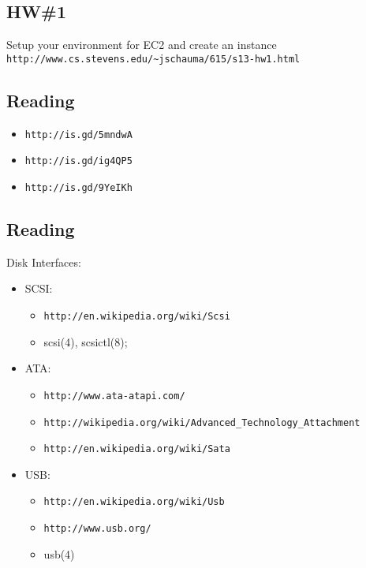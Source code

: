 \documentclass[xga]{xdvislides}
\begin{document}
\subsection{HW\#1}
Setup your environment for EC2 and create an instance
\vfill
\verb+http://www.cs.stevens.edu/~jschauma/615/s13-hw1.html+
\vfill

\subsection{Reading}
\begin{itemize}
	\item \verb+http://is.gd/5mndwA+
	\item \verb+http://is.gd/ig4QP5+
	\item \verb+http://is.gd/9YeIKh+
\end{itemize}

\subsection{Reading}
Disk Interfaces:
\begin{itemize}
	\item SCSI:
		\begin{itemize}
			\item \verb+http://en.wikipedia.org/wiki/Scsi+
			\item scsi(4), scsictl(8);
		\end{itemize}
	\item ATA:
		\begin{itemize}
			\item \verb+http://www.ata-atapi.com/+
			\item \verb+http://wikipedia.org/wiki/Advanced_Technology_Attachment+
			\item \verb+http://en.wikipedia.org/wiki/Sata+
		\end{itemize}
	\item USB:
		\begin{itemize}
			\item \verb+http://en.wikipedia.org/wiki/Usb+
			\item \verb+http://www.usb.org/+
			\item usb(4)
		\end{itemize}
\end{itemize}
\end{document}
